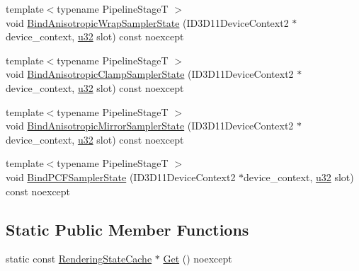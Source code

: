 \begin{DoxyCompactItemize}
\item 
{\footnotesize template$<$typename Pipeline\+StageT $>$ }\\void \hyperlink{structmage_1_1_rendering_state_cache_a7aa05bdfad789807bb9601344261388c}{Bind\+Anisotropic\+Wrap\+Sampler\+State} (I\+D3\+D11\+Device\+Context2 $\ast$device\+\_\+context, \hyperlink{namespacemage_af2b398bf98eb10351f49cad73fe2cc73}{u32} slot) const noexcept
\item 
{\footnotesize template$<$typename Pipeline\+StageT $>$ }\\void \hyperlink{structmage_1_1_rendering_state_cache_af5f4291ceaf2df6c0b76667e228cf173}{Bind\+Anisotropic\+Clamp\+Sampler\+State} (I\+D3\+D11\+Device\+Context2 $\ast$device\+\_\+context, \hyperlink{namespacemage_af2b398bf98eb10351f49cad73fe2cc73}{u32} slot) const noexcept
\item 
{\footnotesize template$<$typename Pipeline\+StageT $>$ }\\void \hyperlink{structmage_1_1_rendering_state_cache_a05c5f99f52f262e7e244bf05d8ae7f56}{Bind\+Anisotropic\+Mirror\+Sampler\+State} (I\+D3\+D11\+Device\+Context2 $\ast$device\+\_\+context, \hyperlink{namespacemage_af2b398bf98eb10351f49cad73fe2cc73}{u32} slot) const noexcept
\item 
{\footnotesize template$<$typename Pipeline\+StageT $>$ }\\void \hyperlink{structmage_1_1_rendering_state_cache_ac9625a625115f531d623098199c64de6}{Bind\+P\+C\+F\+Sampler\+State} (I\+D3\+D11\+Device\+Context2 $\ast$device\+\_\+context, \hyperlink{namespacemage_af2b398bf98eb10351f49cad73fe2cc73}{u32} slot) const noexcept
\end{DoxyCompactItemize}
\subsection*{Static Public Member Functions}
\begin{DoxyCompactItemize}
\item 
static const \hyperlink{structmage_1_1_rendering_state_cache}{Rendering\+State\+Cache} $\ast$ \hyperlink{structmage_1_1_rendering_state_cache_a6523b7a2b99936bf307f7982c80b580f}{Get} () noexcept
\end{DoxyCompactItemize}

